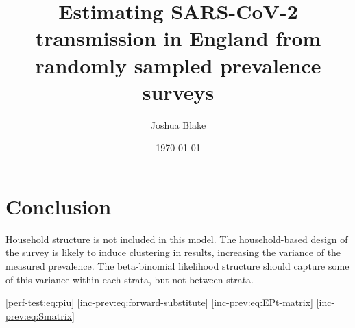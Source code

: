 \documentclass{cam-thesis}
\title{Estimating SARS-CoV-2 transmission in England from randomly sampled prevalence surveys}
\author{Joshua Blake}
\date{\today}
\begin{document}
\frontmatter{}


\listoffigures









\chapter{Conclusion} \label{conclusion}
Household structure is not included in this model.
The household-based design of the survey is likely to induce clustering in results, increasing the variance of the measured prevalence.
The beta-binomial likelihood structure should capture some of this variance within each strata, but not between strata.

\newrefcontext[sorting=nyt]
\printbibliography[heading=bibintoc]

\appendix







\cref{perf-test:eq:piu}
\cref{inc-prev:eq:forward-substitute}
\cref{inc-prev:eq:EPt-matrix}
\cref{inc-prev:eq:Smatrix}
\listoftodos
\end{document}
